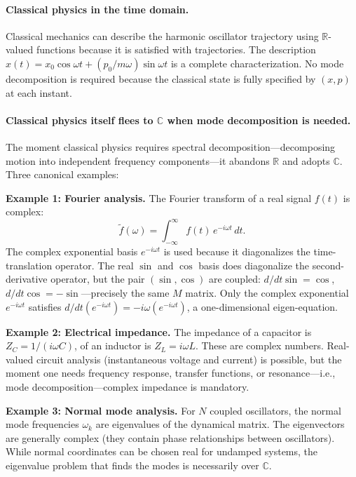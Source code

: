 \documentclass[aps,pra,preprint,groupedaddress,amsmath,amssymb,floatfix]{revtex4-2}
\begin{document}
\paragraph{Classical physics in the time domain.} Classical mechanics can describe the harmonic oscillator trajectory using $\mathbb{R}$-valued functions because it is satisfied with trajectories. The description $x(t) = x_0\cos\omega t + (p_0/m\omega)\sin\omega t$ is a complete characterization. No mode decomposition is required because the classical state is fully specified by $(x,p)$ at each instant.

\paragraph{Classical physics itself flees to $\mathbb{C}$ when mode decomposition is needed.} The moment classical physics requires spectral decomposition---decomposing motion into independent frequency components---it abandons $\mathbb{R}$ and adopts $\mathbb{C}$. Three canonical examples:

\textbf{Example 1: Fourier analysis.} The Fourier transform of a real signal $f(t)$ is complex:
\begin{equation}
\tilde f(\omega) = \int_{-\infty}^{\infty} f(t)\,e^{-i\omega t}\,dt.
\end{equation}
The complex exponential basis $e^{-i\omega t}$ is used because it diagonalizes the time-translation operator. The real $\sin$ and $\cos$ basis does diagonalize the second-derivative operator, but the pair $(\sin,\cos)$ are coupled: $d/dt\sin = \cos$, $d/dt\cos = -\sin$---precisely the same $M$ matrix. Only the complex exponential $e^{-i\omega t}$ satisfies $d/dt(e^{-i\omega t}) = -i\omega(e^{-i\omega t})$, a one-dimensional eigen-equation.

\textbf{Example 2: Electrical impedance.} The impedance of a capacitor is $Z_C = 1/(i\omega C)$, of an inductor is $Z_L = i\omega L$. These are complex numbers. Real-valued circuit analysis (instantaneous voltage and current) is possible, but the moment one needs frequency response, transfer functions, or resonance---i.e., mode decomposition---complex impedance is mandatory.

\textbf{Example 3: Normal mode analysis.} For $N$ coupled oscillators, the normal mode frequencies $\omega_k$ are eigenvalues of the dynamical matrix. The eigenvectors are generally complex (they contain phase relationships between oscillators). While normal coordinates can be chosen real for undamped systems, the eigenvalue problem that finds the modes is necessarily over $\mathbb{C}$.
\end{document}

